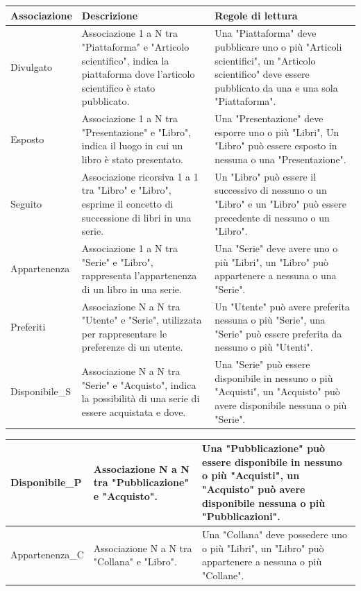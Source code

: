 \begin{center}
\begin{tabular}{ | m{5cm} | m{5cm}| m{6cm} | } 
        \hline
             {\bf Associazione} & {\bf Descrizione}  & {\bf Regole di lettura} \\ 
         \hline
           Divulgato &  Associazione 1 a N tra "Piattaforma" e "Articolo scientifico", indica la piattaforma dove l'articolo scientifico è stato pubblicato.  &  Una "Piattaforma" deve pubblicare uno o più "Articoli scientifici",  un "Articolo scientifico" deve essere pubblicato da una e una sola "Piattaforma".\\ 
         \hline
          Esposto &  Associazione 1 a N tra "Presentazione" e "Libro", indica il luogo in cui un libro è stato presentato.  &   Una "Presentazione" deve esporre uno o più "Libri", Un "Libro" può essere esposto in nessuna o una  "Presentazione".\\ 
         \hline
          Seguito &  Associazione ricorsiva 1 a 1 tra "Libro" e "Libro", esprime il concetto di successione di libri in una serie.  &   Un "Libro" può essere il successivo di nessuno o un "Libro" e un "Libro" può essere precedente di nessuno o un "Libro".\\ 
         \hline
          Appartenenza  &  Associazione 1 a N tra "Serie" e "Libro", rappresenta l'appartenenza di un libro in una serie. &   Una "Serie" deve avere uno o più "Libri", un "Libro" può appartenere a nessuna o una "Serie".\\ 
       \hline
          Preferiti &  Associazione N a N tra "Utente" e "Serie", utilizzata per rappresentare le preferenze di un utente. & Un "Utente" può avere preferita nessuna o più "Serie", una "Serie" può essere preferita da nessuno o più "Utenti".\\
       \hline
         Disponibile\_S  &  Associazione N a N tra "Serie" e "Acquisto", indica la possibilità di una serie di essere acquistata e dove.  &  Una "Serie" può essere disponibile in nessuno o più "Acquisti", un "Acquisto" può avere disponibile nessuna o più "Serie".\\ 
         \hline 
\end{tabular}



    

\begin{tabular}{ | m{5cm} | m{5cm}| m{6cm} | }  
       \hline
         Disponibile\_P  &  Associazione N a N tra "Pubblicazione" e "Acquisto".  & Una "Pubblicazione" può essere disponibile in nessuno o più "Acquisti", un "Acquisto" può avere disponibile nessuna o più "Pubblicazioni".\\ 
         \hline
         
       
       Appartenenza\_C  &  Associazione N a N tra "Collana" e "Libro". & Una "Collana" deve possedere uno o più "Libri", un "Libro" può appartenere a  nessuna o più "Collane".\\ 
       \hline
 \end{tabular}
\end{center}